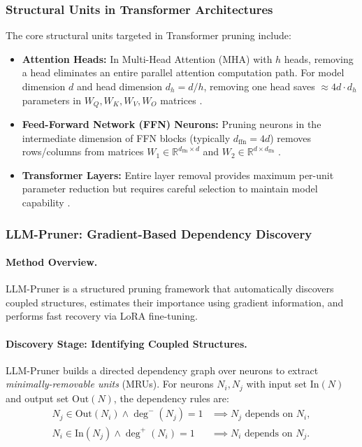 \subsubsection{Structural Units in Transformer Architectures}

The core structural units targeted in Transformer pruning include:

\begin{itemize}
	\item \textbf{Attention Heads:} In Multi-Head Attention (MHA) with $h$ heads, removing a head eliminates an entire parallel attention computation path. For model dimension $d$ and head dimension $d_h = d/h$, removing one head saves $\approx 4d \cdot d_h$ parameters in $W_Q, W_K, W_V, W_O$ matrices \cite{michel2022not}.
	
	\item \textbf{Feed-Forward Network (FFN) Neurons:} Pruning neurons in the intermediate dimension of FFN blocks (typically $d_{\text{ffn}} = 4d$) removes rows/columns from matrices $W_1 \in \mathbb{R}^{d_{\text{ffn}} \times d}$ and $W_2 \in \mathbb{R}^{d \times d_{\text{ffn}}}$ \cite{kurtic2022optimal}.
	
	\item \textbf{Transformer Layers:} Entire layer removal provides maximum per-unit parameter reduction but requires careful selection to maintain model capability \cite{kim2021learned}.
\end{itemize}

\subsubsection{LLM-Pruner: Gradient-Based Dependency Discovery}

\paragraph{Method Overview.} LLM-Pruner \cite{ma2023llmpruner} is a structured pruning framework that automatically discovers coupled structures, estimates their importance using gradient information, and performs fast recovery via LoRA fine-tuning.

\paragraph{Discovery Stage: Identifying Coupled Structures.}
LLM-Pruner builds a directed dependency graph over neurons to extract \emph{minimally-removable units} (MRUs). For neurons $N_i, N_j$ with input set $\mathrm{In}(N)$ and output set $\mathrm{Out}(N)$, the dependency rules are:
\begin{align}
	N_j \in \mathrm{Out}(N_i) \wedge \deg^{-}(N_j)=1 &\implies N_j \text{ depends on } N_i, \label{eq:dep1}\\
	N_i \in \mathrm{In}(N_j) \wedge \deg^{+}(N_i)=1 &\implies N_i \text{ depends on } N_j. \label{eq:dep2}
\end{align}

